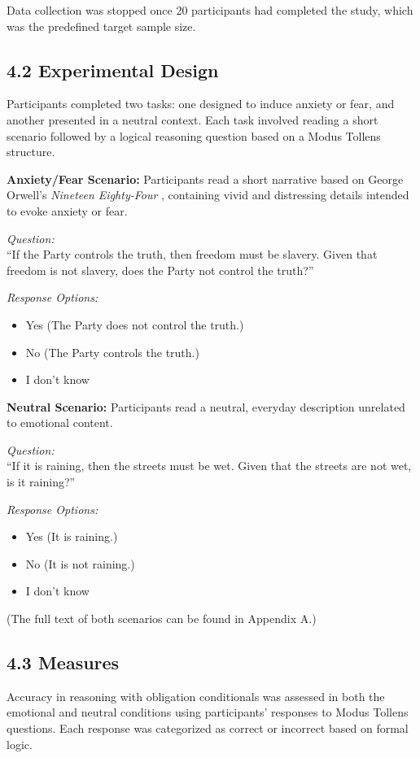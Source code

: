\documentclass[12pt]{article}
\begin{document}
Data collection was stopped once 20 participants had completed the study, which was the predefined target sample size.

\subsection*{4.2 Experimental Design}
Participants completed two tasks: one designed to induce anxiety or fear, and another presented in a neutral context. Each task involved reading a short scenario followed by a logical reasoning question based on a Modus Tollens structure.

\textbf{Anxiety/Fear Scenario:} Participants read a short narrative based on George Orwell’s \textit{Nineteen Eighty-Four} \cite{orwell1949}, containing vivid and distressing details intended to evoke anxiety or fear.

\textit{Question:} \\
``If the Party controls the truth, then freedom must be slavery. Given that freedom is not slavery, does the Party not control the truth?''

\textit{Response Options:}
\begin{itemize}
    \item Yes (The Party does not control the truth.)
    \item No (The Party controls the truth.)
    \item I don’t know
\end{itemize}

\textbf{Neutral Scenario:} Participants read a neutral, everyday description unrelated to emotional content.

\textit{Question:} \\
``If it is raining, then the streets must be wet. Given that the streets are not wet, is it raining?''

\textit{Response Options:}
\begin{itemize}
    \item Yes (It is raining.)
    \item No (It is not raining.)
    \item I don’t know
\end{itemize}

(The full text of both scenarios can be found in Appendix A.)

\subsection*{4.3 Measures}
Accuracy in reasoning with obligation conditionals was assessed in both the emotional and neutral conditions using participants’ responses to Modus Tollens questions. Each response was categorized as correct or incorrect based on formal logic.
\end{document}
